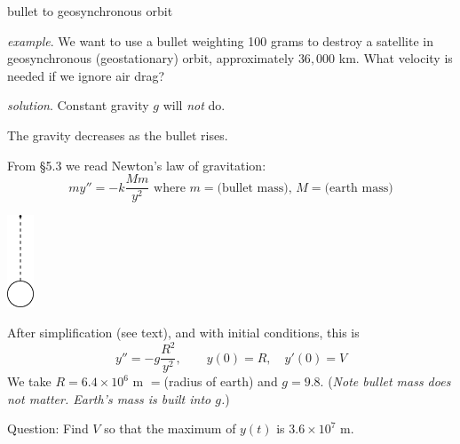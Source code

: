 \documentclass[dvipsnames,colorlinks]{beamer}
\begin{document}
\begin{frame}{bullet to geosynchronous orbit}

\small

\noindent \emph{example}.  We want to use a bullet weighting 100 grams to destroy a satellite in geosynchronous (geostationary) orbit, approximately $36,000$ km.  What velocity is needed if we ignore air drag?

\medskip
\noindent \emph{solution}.  Constant gravity $g$ will \emph{not} do.

\noindent The gravity decreases as the bullet rises.

\noindent From \S5.3 we read Newton's law of gravitation:
    $$m y'' = -k \frac{Mm}{y^2} \text{ where $m=$(bullet mass), $M=$(earth mass)}$$

\vspace{-30mm}

\hfill \includegraphics[width=0.06\textwidth]{figs/earthbullet}

\vspace{5mm}

After simplification (see text), and with initial conditions, this is
    $$y'' = -g \frac{R^2}{y^2}, \qquad y(0)=R, \quad y'(0)=V$$
We take $R=6.4\times 10^6$ m $=$(radius of earth) and $g=9.8$.  (\emph{Note bullet mass does not matter.  Earth's mass is built into $g$.})

\medskip
Question: Find $V$ so that the maximum of $y(t)$ is $3.6\times 10^7$ m.
\end{frame}
\end{document}
